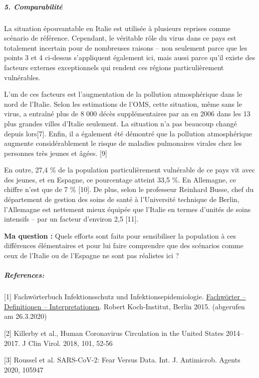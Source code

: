 \hypertarget{5-comparabilituxe9}{%
\subparagraph{\texorpdfstring{\textbf{5.
Comparabilité}}{5. Comparabilité}}\label{5-comparabilituxe9}}

La situation épouvantable en Italie est utilisée à plusieurs reprises
comme scénario de référence. Cependant, le véritable rôle du virus dans
ce pays est totalement incertain pour de nombreuses raisons -- non
seulement parce que les points 3 et 4 ci-dessus s'appliquent également
ici, mais aussi parce qu'il existe des facteurs externes exceptionnels
qui rendent ces régions particulièrement vulnérables.

L'un de ces facteurs est l'augmentation de la pollution atmosphérique
dans le nord de l'Italie. Selon les estimations de l'OMS, cette
situation, même sans le virus, a entraîné plus de 8 000 décès
supplémentaires par an en 2006 dans les 13 plus grandes villes d'Italie
seulement. La situation n'a pas beaucoup changé depuis lors{[}7{]}.
Enfin, il a également été démontré que la pollution atmosphérique
augmente considérablement le risque de maladies pulmonaires virales chez
les personnes très jeunes et âgées. {[}9{]}

En outre, 27,4 \% de la population particulièrement vulnérable de ce
pays vit avec des jeunes, et en Espagne, ce pourcentage atteint 33,5 \%.
En Allemagne, ce chiffre n'est que de 7 \% {[}10{]}. De plus, selon le
professeur Reinhard Busse, chef du département de gestion des soins de
santé à l'Université technique de Berlin, l'Allemagne est nettement
mieux équipée que l'Italie en termes d'unités de soins intensifs -- par
un facteur d'environ 2,5 {[}11{]}.

\textbf{Ma question :} Quels efforts sont faits pour sensibiliser la
population à ces différences élémentaires et pour lui faire comprendre
que des scénarios comme ceux de l'Italie ou de l'Espagne ne sont pas
réalistes ici ?

\hypertarget{references}{%
\subparagraph{\texorpdfstring{\textbf{References:}}{References:}}\label{references}}

{[}1{]} Fachwörterbuch Infektionsschutz und Infektionsepidemiologie.
\href{https://www.rki.de/DE/Content/Service/Publikationen/Fachwoerterbuch_Infektionsschutz.html}{Fachwörter
-- Definitionen -- Interpretationen}. Robert Koch-Institut, Berlin 2015.
(abgerufen am 26.3.2020)

{[}2{]} Killerby et al., Human Coronavirus Circulation in the United
States 2014--2017. J Clin Virol. 2018, 101, 52-56

{[}3{]} Roussel et al. SARS-CoV-2: Fear Versus Data. Int. J. Antimicrob.
Agents 2020, 105947

